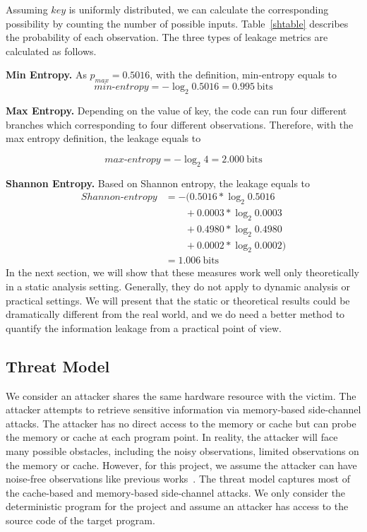 Assuming $\mathit{key}$ is uniformly distributed, we can calculate the corresponding
possibility by counting the number of possible inputs. Table~\ref{shtable}
describes the probability of each observation. The three types of leakage metrics are
calculated as follows.

\vspace{3pt}
\textbf{Min Entropy.}
As $p_{\mathit{max}} = 0.5016$, with the definition, min-entropy equals to
\begin{displaymath}
    \mathit{min\text{-}entropy} = -\log_2{0.5016} = 0.995\ \mathrm{bits}
\end{displaymath}

\textbf{Max Entropy.}
Depending on the value of key, the code can run four different branches which
corresponding to four different observations. Therefore, with the max entropy
definition, the leakage equals to

\begin{displaymath}
    \mathit{max\text{-}entropy} = -\log_2{4} = 2.000\ \mathrm{bits}
\end{displaymath}

\vspace{3pt}
\textbf{Shannon Entropy.}
Based on Shannon entropy, the leakage equals to
{\footnotesize
\begin{align*}
    \mathit{Shannon\text{-}entropy} & = -(0.5016*\log_{2}0.5016      \\
                                    & \qquad+ 0.0003*\log_{2}0.0003  \\
                                    & \qquad+ 0.4980*\log_{2}0.4980  \\
                                    & \qquad+ 0.0002*\log_{2}0.0002) \\
                                    & = 1.006\ \mathrm{bits}
\end{align*}
}
In the next section, we will show that these measures work well only
theoretically in a static analysis setting. 
Generally, they do not apply to dynamic analysis or practical
settings. We will present that the static or theoretical results could be
dramatically different from the real world, and we do need a better method to
quantify the information leakage from a practical point of view.

\subsection{Threat Model}
We consider an attacker shares the same hardware resource with the victim.
The attacker attempts to retrieve sensitive information via memory-based
side-channel attacks. The attacker has no direct access to the memory or cache
but can probe the memory or cache at each program point. In reality, the
attacker will face many possible obstacles, including the noisy observations,
limited observations on the memory or cache. However, for this project, we assume
the attacker can have noise-free observations like previous works~\cite{203878,182946,Brotzman19Casym}. 
The threat model captures most of the cache-based and memory-based side-channel attacks. 
We only consider the deterministic program for the project and assume an attacker 
has access to the source code of the target program.
